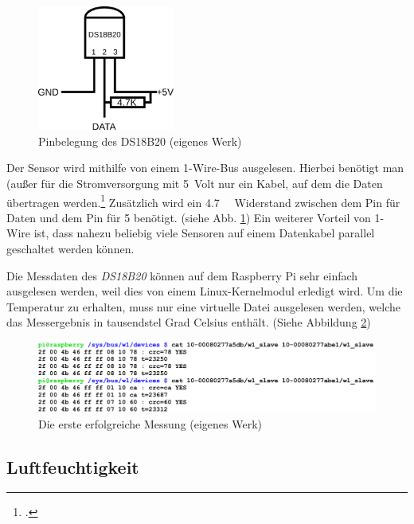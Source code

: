 \begin{figure}[h]
  \centering
     \includegraphics[width=0.4\textwidth]{figures/temp_pin.png}
  \caption{Pinbelegung des DS18B20 (eigenes Werk)}
  \label{fig:temp_pin}
\end{figure}

Der Sensor wird mithilfe von einem \gls{1-Wire}-\gls{Bus} ausgelesen. Hierbei benötigt man (außer für die Stromversorgung mit \SI{5}{\gls{Volt}} nur ein Kabel, auf dem die Daten übertragen werden.\footcite{1-wire} Zusätzlich wird ein \SI{4.7}{\kilo{}} Widerstand zwischen dem Pin für Daten und dem Pin für \SI[retain-explicit-plus]{+5}{} benötigt. (siehe Abb. \ref{fig:temp_pin})
Ein weiterer Vorteil von 1-Wire ist, dass nahezu beliebig viele Sensoren auf einem Datenkabel parallel geschaltet werden können.

Die Messdaten des \emph{DS18B20} können auf dem Raspberry Pi sehr einfach ausgelesen werden, weil dies von einem Linux-\gls{Kernelmodul} erledigt wird. Um die Temperatur zu erhalten, muss  nur eine virtuelle Datei ausgelesen werden, welche das Messergebnis in tausendstel Grad Celsius enthält. (Siehe Abbildung \ref{fig:temp_screenshot})

\begin{figure}[h]
  \centering
     \includegraphics[width=\textwidth]{figures/temp_screenshot.png}
  \caption{Die erste erfolgreiche Messung (eigenes Werk)}
  \label{fig:temp_screenshot}
\end{figure}

\subsection{Luftfeuchtigkeit}
\label{subsec:Luftfeuchtigkeit}

